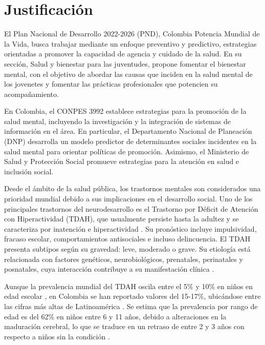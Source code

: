 \section{Justificación}

El Plan Nacional de Desarrollo 2022-2026 (PND), Colombia Potencia Mundial de la Vida, busca trabajar mediante  un enfoque preventivo y predictivo, estrategias orientadas a promover la capacidad de agencia y cuidado de la salud. En su sección, Salud y bienestar para las juventudes, propone fomentar el bienestar mental, con el objetivo de abordar las causas que inciden en la salud mental de los jovenetes y fomentar las prácticas profesionales que potencien su acompañamiento.

En Colombia, el CONPES 3992 establece estrategias para la promoción de la salud mental, incluyendo la investigación y la integración de sistemas de información en el área. En particular, el Departamento Nacional de Planeación (DNP) desarrolla un modelo predictor de determinantes sociales incidentes en la salud mental para orientar políticas de promoción. Asimismo, el Ministerio de Salud y Protección Social promueve estrategias para la atención en salud e inclusión social.

Desde el ámbito de la salud pública, los trastornos mentales son considerados una prioridad mundial debido a sus implicaciones en el desarrollo social. Uno de los principales trastornos del neurodesarrollo es el Trastorno por Déficit de Atención con Hiperactividad (TDAH), que usualmente persiste hasta la adultez y se caracteriza por inatención e hiperactividad \cite{APA_TDAH}. Su pronóstico incluye impulsividad, fracaso escolar, comportamientos antisociales e incluso delincuencia. El TDAH presenta subtipos según su gravedad: leve, moderado o grave. Su etiología está relacionada con factores genéticos, neurobiológicos, prenatales, perinatales y posnatales, cuya interacción contribuye a su manifestación clínica \cite{Saxena2013}. 

Aunque la prevalencia mundial del TDAH oscila entre el 5\% y 10\% en niños en edad escolar \cite{GalianaSimal2020}, en Colombia se han reportado valores del 15-17\%, ubicándose entre las cifras más altas de Latinoamérica \cite{Pineda2003}. Se estima que la prevalencia por rango de edad es del 62\% en niños entre 6 y 11 años, debido a alteraciones en la maduración cerebral, lo que se traduce en un retraso de entre 2 y 3 años con respecto a niños sin la condición \cite{LlanosLizcano2019}.

